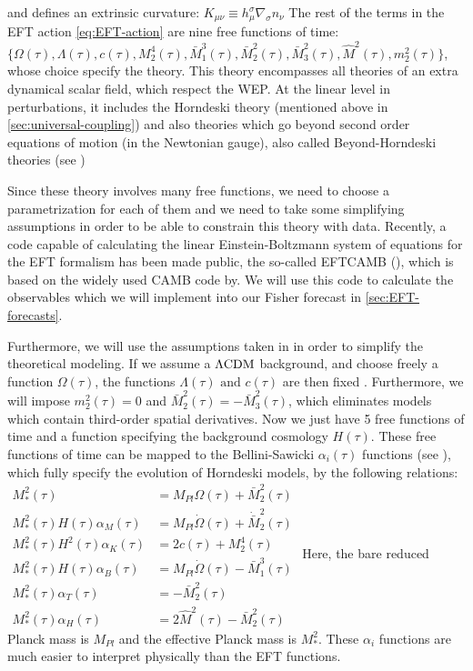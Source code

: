 and defines an extrinsic curvature:
\beeqp$
K_{\mu \nu} \equiv h^{\sigma}_{\mu} \nabla_{\sigma} n_\nu
$
The rest of the terms in the EFT action \cref{eq:EFT-action} are nine free functions of time:\\
$\{\Omega(\tau), \Lambda(\tau), c(\tau), M_{2}^4 (\tau), \bar{M}_{1}^3 (\tau), \bar{M}_2^2 (\tau), \bar{M}_3^2 (\tau),
 \hat{M}^2 (\tau), m^2_2(\tau)\}$, whose choice specify the theory.
This theory encompasses all theories of an extra dynamical scalar field, which respect the WEP.
At the linear level in perturbations, it includes the Horndeski theory (mentioned above in \cref{sec:universal-coupling}) 
and also theories which go beyond second order equations of motion (in the Newtonian gauge), also called
Beyond-Horndeski theories (see \cite{Gleyzes2016, Piazza, Bellini})

Since these theory involves many free functions, we need to choose a parametrization for each of them and 
we need to take some simplifying assumptions in order to be able to constrain this theory with data.
Recently, a code capable of calculating the linear Einstein-Boltzmann system of equations for the EFT formalism
has been made public, the so-called \textsc{EFTCAMB} (\cite{Hu, Raveri, Silvestri}), which is based 
on the widely used \textsc{CAMB} code by\cite{lewis_efficient_2000}. 
We will use this code to calculate the observables which we will 
implement into our Fisher forecast in \cref{sec:EFT-forecasts}.

Furthermore, we will use the assumptions taken in \cite{planck_collaboration_planck_2016} in order to simplify
the theoretical modeling.
If we assume a $\Lambda\mathrm{CDM}$ background, and choose freely a function
$\Omega(\tau)$, the functions $\Lambda(\tau) \textrm{ and } c(\tau)$ are then fixed \cite{cite Hu 2014}.
Furthermore, we will impose $ m^2_2(\tau) = 0$ and $ \bar{M}_2^2 (\tau) = - \bar{M}_3^2 (\tau)$,
which eliminates models which contain third-order spatial derivatives.
Now we just have 5 free functions of time and a function specifying the background cosmology $H(\tau)$.
These free functions of time can be mapped to the Bellini-Sawicki $\alpha_i (\tau)$ 
functions (see \cite{bellini-sawicki}),
which fully specify the evolution of Horndeski models, by the following relations:
\beeqal$
\begin{split}
M_{*}^2 (\tau) & = M_{Pl}\Omega(\tau) + \bar{M}_2^2 (\tau) \\
M_{*}^2 (\tau) H(\tau) \alpha_M (\tau)   & = M_{Pl}\dot{\Omega}(\tau) + \dot{\bar{M}}_2^2 (\tau) \\
M_{*}^2 (\tau) H^2(\tau) \alpha_K (\tau)   & = 2 c (\tau) + M_2^4 (\tau) \\
M_{*}^2 (\tau) H(\tau) \alpha_B (\tau)   & = M_{Pl}\dot{\Omega}(\tau) - \bar{M}_{1}^3 (\tau)\\
M_{*}^2 (\tau) \alpha_T (\tau)   & = - \bar{M}_2^2 (\tau) \\
M_{*}^2 (\tau) \alpha_H (\tau)   & = 2 \hat{M}^2(\tau) - \bar{M}_2^2 (\tau)
\end{split}
$ 
Here, the bare reduced Planck mass is $M_{Pl}$ and the effective Planck mass is $ M_{*}^2 $.
These $\alpha_i$ functions are much easier to interpret physically than the EFT functions.

